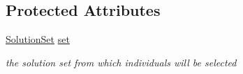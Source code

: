 \subsection*{Protected Attributes}
\begin{DoxyCompactItemize}
\item 
\hypertarget{classcom_1_1msu_1_1moo_1_1operators_1_1AbstractSelection_ade84bd57f9d26c9d9b2e90bb6591b79c}{\hyperlink{classcom_1_1msu_1_1moo_1_1model_1_1solution_1_1SolutionSet}{Solution\-Set} \hyperlink{classcom_1_1msu_1_1moo_1_1operators_1_1AbstractSelection_ade84bd57f9d26c9d9b2e90bb6591b79c}{set}}\label{classcom_1_1msu_1_1moo_1_1operators_1_1AbstractSelection_ade84bd57f9d26c9d9b2e90bb6591b79c}

\begin{DoxyCompactList}\small\item\em the solution set from which individuals will be selected \end{DoxyCompactList}\end{DoxyCompactItemize}


